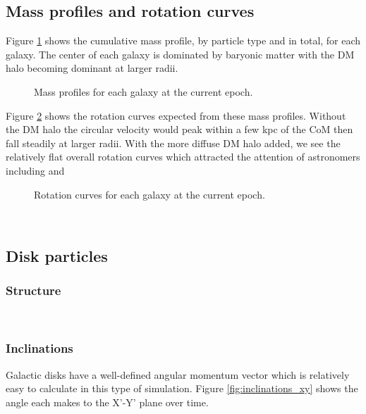 \documentclass[twocolumn]{aastex63}
\newcommand{\todo}{\color{red}{TODO}\color{black}\hspace{2mm}}
\begin{document}
\subsection{Mass profiles and rotation curves}

Figure \ref{fig:massprof0} shows the cumulative mass profile, by particle type and in total, for each galaxy. The center of each galaxy is dominated by baryonic matter with the DM halo becoming dominant at larger radii.
\begin{figure}[bht!]
	\caption{Mass profiles for each galaxy at the current epoch.
		\label{fig:massprof0}}
\end{figure}

Figure \ref{fig:rotcurve0} shows the rotation curves expected from these mass profiles. Without the DM halo the circular velocity would peak within a few kpc of the CoM then fall steadily at larger radii. With the more diffuse DM halo added, we see the relatively flat overall rotation curves which attracted the attention of astronomers including \citet{zwicky_rotverschiebung_1933} and \citet{rubin_rotation_1970}

\begin{figure}[bht!]
	\caption{Rotation curves for each galaxy at the current epoch.
		\label{fig:rotcurve0}}
\end{figure}

\todo{set xlim, make y axis log}\ 

\subsection{Disk particles}

\subsubsection{Structure}

\todo{identify the bar?}\ 

\todo{more on spiral arms}

\subsubsection{Inclinations}

Galactic disks have a well-defined angular momentum vector which is relatively easy to calculate in this type of simulation. Figure \ref{fig:inclinations_xy} shows the angle each makes to the X'-Y' plane over time.
\end{document}
